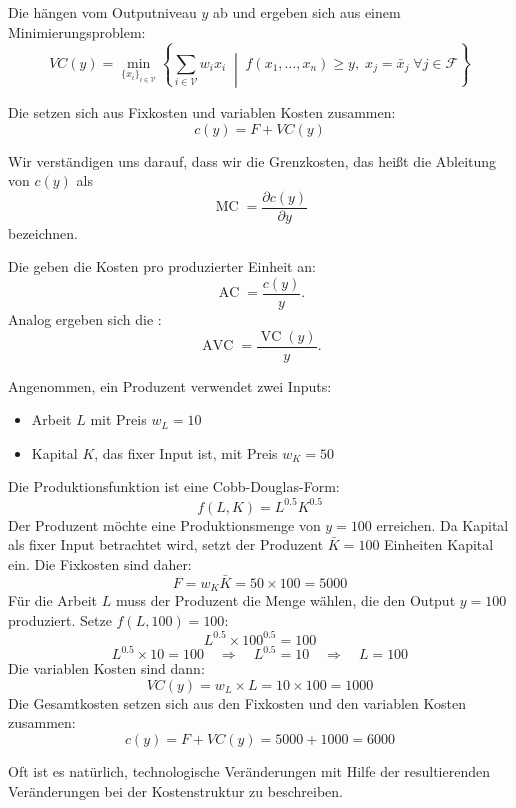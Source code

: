 \begin{definition}
	Die  hängen vom Outputniveau \( y \) ab und ergeben sich aus einem Minimierungsproblem:
	\[
		VC(y) = \min_{\{x_i\}_{i \in \mathcal{V}}} \left\{ \sum_{i \in \mathcal{V}} w_i x_i \;\middle|\; f(x_1, \dots, x_n) \geq y, \; x_j = \bar{x}_j \;\forall j \in \mathcal{F} \right\}
	\]
\end{definition}
\begin{definition}
	Die  setzen sich aus Fixkosten und variablen Kosten zusammen:
	\[
		c(y) = F + VC(y)
	\]
\end{definition}

\begin{notation}
	Wir verständigen uns darauf, dass wir die Grenzkosten, das heißt die Ableitung von $c(y)$ als
	\[
		\operatorname{MC} = \frac{\partial c(y)}{\partial y}
	\]
	bezeichnen.
\end{notation}

\begin{definition}
	Die  geben die Kosten pro produzierter Einheit an:
	\[
		\operatorname{AC} = \frac{c(y)}{y}
		.\]
	Analog ergeben sich die :
	\[
		\operatorname{AVC} = \frac{\operatorname{VC}(y)}{y}
		.\]
\end{definition}

\begin{example}
	Angenommen, ein Produzent verwendet zwei Inputs:
	\begin{itemize}
		\item Arbeit \( L \) mit Preis \( w_L = 10 \)
		\item Kapital \( K \), das fixer Input ist, mit Preis \( w_K = 50 \)
	\end{itemize}
	Die Produktionsfunktion ist eine Cobb-Douglas-Form:
	\[
		f(L, K) = L^{0.5} K^{0.5}
	\]
	Der Produzent möchte eine Produktionsmenge von \( y = 100 \) erreichen.
	Da Kapital als fixer Input betrachtet wird, setzt der Produzent \( \bar{K} = 100 \) Einheiten Kapital ein. Die Fixkosten sind daher:
	\[
		F = w_K \bar{K} = 50 \times 100 = 5000
	\]
	Für die Arbeit \( L \) muss der Produzent die Menge wählen, die den Output \( y = 100 \) produziert. Setze \( f(L, 100) = 100 \):
	\[
		L^{0.5} \times 100^{0.5} = 100
	\]
	\[
		L^{0.5} \times 10 = 100 \quad \Rightarrow \quad L^{0.5} = 10 \quad \Rightarrow \quad L = 100
	\]
	Die variablen Kosten sind dann:
	\[
		VC(y) = w_L \times L = 10 \times 100 = 1000
	\]Die Gesamtkosten setzen sich aus den Fixkosten und den variablen Kosten zusammen:
	\[
		c(y) = F + VC(y) = 5000 + 1000 = 6000
	\]
\end{example}
Oft ist es natürlich, technologische Veränderungen mit Hilfe der resultierenden Veränderungen bei der Kostenstruktur zu beschreiben.


